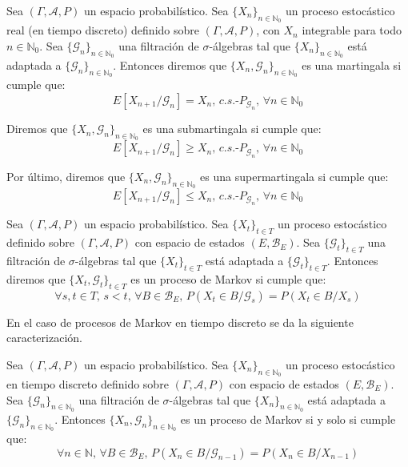 \begin{definicion}\label{martingala}
Sea $(\Gamma , \mathcal{A}, P)$ un espacio probabilístico. Sea $\{X_n\}_{n\in \mathds{N}_0}$ un proceso estocástico real (en tiempo discreto) definido sobre $(\Gamma, \mathcal{A}, P)$, con $X_n$ integrable para todo $n\in\mathds{N}_0$. Sea $\{\mathscr{G}_n\}_{n\in\mathds{N}_0}$ una filtración de $\sigma$-álgebras tal que $\{X_n\}_{n\in \mathds{N}_0}$ está adaptada a $\{\mathscr{G}_n\}_{n\in\mathds{N}_0}$. Entonces diremos que $\{X_n, \mathscr{G}_n\}_{n\in\mathds{N}_0}$ es una martingala si cumple que:
$$ E[X_{n+1}/\mathscr{G}_n] = X_n\text{, }c.s.\text{-}P_{\mathscr{G}_n}\text{, }\forall n\in\mathds{N}_0$$

Diremos que $\{X_n, \mathscr{G}_n\}_{n\in\mathds{N}_0}$ es una submartingala si cumple que:
\begin{equation}\label{submartingala}
 E[X_{n+1}/\mathscr{G}_n] \geq X_n\text{, }c.s.\text{-}P_{\mathscr{G}_n}\text{, }\forall n\in\mathds{N}_0
\end{equation}

Por último, diremos que $\{X_n, \mathscr{G}_n\}_{n\in\mathds{N}_0}$ es una supermartingala si cumple que:
$$ E[X_{n+1}/\mathscr{G}_n] \leq X_n\text{, }c.s.\text{-}P_{\mathscr{G}_n}\text{, }\forall n\in\mathds{N}_0$$
\end{definicion}

\begin{definicion}
Sea $(\Gamma , \mathcal{A}, P)$ un espacio probabilístico. Sea $\{X_t\}_{t\in T}$ un proceso estocástico definido sobre $(\Gamma, \mathcal{A}, P)$ con espacio de estados $(E,\mathscr{B}_E)$. Sea $\{\mathscr{G}_t\}_{t\in T}$ una filtración de $\sigma$-álgebras tal que $\{X_t\}_{t\in T}$ está adaptada a $\{\mathscr{G}_t\}_{t\in T}$. Entonces diremos que $\{X_t, \mathscr{G}_t\}_{t\in T}$ es un proceso de Markov si cumple que:
$$\forall s,t\in T\text{, } s<t\text{, }\forall B\in \mathscr{B}_E\text{, } P(X_t\in B/\mathscr{G}_s) = P(X_t\in B/X_{s}) $$
\end{definicion}

En el caso de procesos de Markov en tiempo discreto se da la siguiente caracterización.

\begin{proposicion}
Sea $(\Gamma , \mathcal{A}, P)$ un espacio probabilístico. Sea $\{X_n\}_{n\in \mathds{N}_0}$ un proceso estocástico en tiempo discreto definido sobre $(\Gamma, \mathcal{A}, P)$ con espacio de estados $(E,\mathscr{B}_E)$. Sea $\{\mathscr{G}_n\}_{n\in \mathds{N}_0}$ una filtración de $\sigma$-álgebras tal que $\{X_n\}_{n\in \mathds{N}_0}$ está adaptada a $\{\mathscr{G}_n\}_{n\in \mathds{N}_0}$. Entonces $\{X_n, \mathscr{G}_n\}_{n\in \mathds{N}_0}$ es un proceso de Markov si y solo si cumple que:
$$\forall n \in \mathds{N}\text{, }\forall B\in \mathscr{B}_E\text{, } P(X_n\in B/\mathscr{G}_{n-1}) = P(X_n\in B/X_{n-1}) $$
\end{proposicion}

